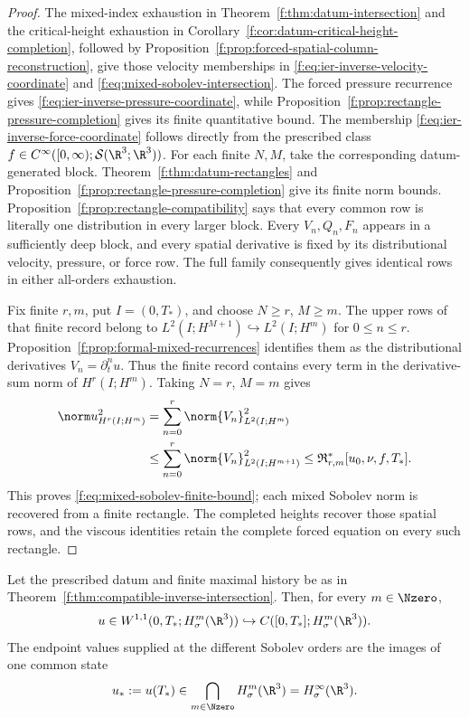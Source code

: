 \begin{proof}
The mixed-index exhaustion in Theorem~\ref{f:thm:datum-intersection} and the
critical-height exhaustion in
Corollary~\ref{f:cor:datum-critical-height-completion}, followed by
Proposition~\ref{f:prop:forced-spatial-column-reconstruction}, give those
velocity memberships in \eqref{f:eq:ier-inverse-velocity-coordinate} and
\eqref{f:eq:mixed-sobolev-intersection}.  The forced pressure recurrence gives
\eqref{f:eq:ier-inverse-pressure-coordinate}, while
Proposition~\ref{f:prop:rectangle-pressure-completion} gives its finite
quantitative bound.
The membership \eqref{f:eq:ier-inverse-force-coordinate} follows directly from
the prescribed class
\(f\in C^\infty([0,\infty);\mathcal S(\R^3;\R^3))\).
For each finite \(N,M\), take the corresponding datum-generated block.
Theorem~\ref{f:thm:datum-rectangles} and
Proposition~\ref{f:prop:rectangle-pressure-completion} give its finite norm
bounds.  Proposition~\ref{f:prop:rectangle-compatibility} says that every
common row is literally one distribution in every larger block.
Every \(V_n,Q_n,F_n\) appears in a sufficiently deep block, and every
spatial derivative is fixed by its distributional velocity, pressure, or force
row.  The full family consequently gives identical rows in either all-orders
exhaustion.

Fix finite \(r,m\), put \(I=(0,T_*)\), and choose \(N\ge r\),
\(M\ge m\). The upper rows of that finite record belong to
\(L^2(I;H^{M+1})\hookrightarrow L^2(I;H^m)\) for \(0\le n\le r\).
Proposition~\ref{f:prop:formal-mixed-recurrences} identifies them as the
distributional derivatives \(V_n=\partial_t^nu\). Thus the finite record
contains every term in the derivative-sum norm of \(H^r(I;H^m)\).
Taking \(N=r\), \(M=m\) gives
\[
 \begin{aligned}
 \norm u_{H^r(I;H^m)}^2
 &=\sum_{n=0}^r\norm{V_n}_{L^2(I;H^m)}^2\\
 &\le\sum_{n=0}^r\norm{V_n}_{L^2(I;H^{m+1})}^2
 \le\mathfrak R_{r,m}^*[u_0,\nu,f,T_*].
 \end{aligned}
\]
This proves \eqref{f:eq:mixed-sobolev-finite-bound}; each mixed Sobolev norm is
recovered from a finite rectangle.  The completed heights recover those spatial rows, and the viscous identities retain the complete forced
equation on every such rectangle.
\end{proof}

\begin{proposition}
\label{f:prop:ier-complete-spatial-endpoint}
Let the prescribed datum and finite maximal history be as in
Theorem~\ref{f:thm:compatible-inverse-intersection}.  Then, for every
\(m\in\Nzero\),
\begin{equation}
 u\in W^{1,1}(0,T_*;H^m_\sigma(\R^3))
 \hookrightarrow C([0,T_*];H^m_\sigma(\R^3)).
 \label{f:eq:ier-spatial-row-W11}
\end{equation}
The endpoint values supplied at the different Sobolev orders are the images
of one common state
\begin{equation}
 u_*:=u(T_*)\in\bigcap_{m\in\Nzero}H^m_\sigma(\R^3)
 =H^\infty_\sigma(\R^3).
 \label{f:eq:ier-common-spatial-endpoint}
\end{equation}
\end{proposition}

